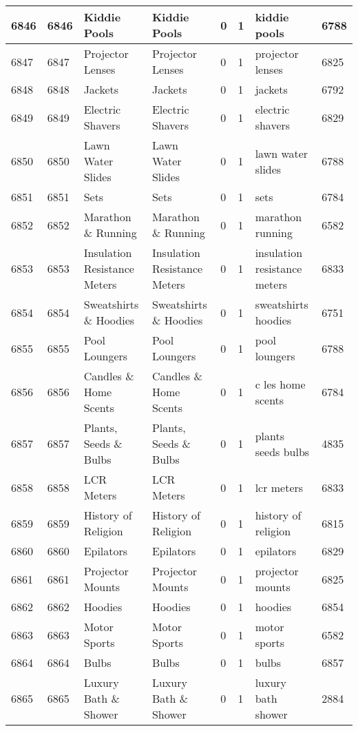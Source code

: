 \begin{longtable}{|l|l|l|l|l|l|l|l|}
6846 & 6846 & Kiddie Pools & Kiddie Pools & 0 & 1 & kiddie pools & 6788 \\ \hline 
6847 & 6847 & Projector Lenses & Projector Lenses & 0 & 1 & projector lenses & 6825 \\ \hline 
6848 & 6848 & Jackets & Jackets & 0 & 1 & jackets & 6792 \\ \hline 
6849 & 6849 & Electric Shavers & Electric Shavers & 0 & 1 & electric shavers & 6829 \\ \hline 
6850 & 6850 & Lawn Water Slides & Lawn Water Slides & 0 & 1 & lawn water slides & 6788 \\ \hline 
6851 & 6851 & Sets & Sets & 0 & 1 & sets & 6784 \\ \hline 
6852 & 6852 & Marathon \& Running & Marathon \& Running & 0 & 1 & marathon running & 6582 \\ \hline 
6853 & 6853 & Insulation Resistance Meters & Insulation Resistance Meters & 0 & 1 & insulation resistance meters & 6833 \\ \hline 
6854 & 6854 & Sweatshirts \& Hoodies & Sweatshirts \& Hoodies & 0 & 1 & sweatshirts hoodies & 6751 \\ \hline 
6855 & 6855 & Pool Loungers & Pool Loungers & 0 & 1 & pool loungers & 6788 \\ \hline 
6856 & 6856 & Candles \& Home Scents & Candles \& Home Scents & 0 & 1 & c les home scents & 6784 \\ \hline 
6857 & 6857 & Plants, Seeds \& Bulbs & Plants, Seeds \& Bulbs & 0 & 1 & plants seeds bulbs & 4835 \\ \hline 
6858 & 6858 & LCR Meters & LCR Meters & 0 & 1 & lcr meters & 6833 \\ \hline 
6859 & 6859 & History of Religion & History of Religion & 0 & 1 & history of religion & 6815 \\ \hline 
6860 & 6860 & Epilators & Epilators & 0 & 1 & epilators & 6829 \\ \hline 
6861 & 6861 & Projector Mounts & Projector Mounts & 0 & 1 & projector mounts & 6825 \\ \hline 
6862 & 6862 & Hoodies & Hoodies & 0 & 1 & hoodies & 6854 \\ \hline 
6863 & 6863 & Motor Sports & Motor Sports & 0 & 1 & motor sports & 6582 \\ \hline 
6864 & 6864 & Bulbs & Bulbs & 0 & 1 & bulbs & 6857 \\ \hline 
6865 & 6865 & Luxury Bath \& Shower & Luxury Bath \& Shower & 0 & 1 & luxury bath shower & 2884 \\ \hline 

\end{longtable}

